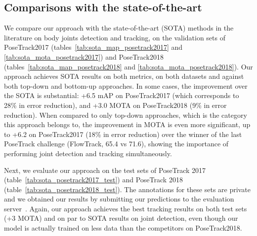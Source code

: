 \documentclass[10pt,twocolumn,letterpaper]{article}
\begin{document}
\subsection{Comparisons with the state-of-the-art} \label{sec:sota}
We compare our approach with the state-of-the-art (SOTA) methods in the literature on body joints detection and tracking, on the validation sets of PoseTrack2017 (tables~\ref{tab:sota_map_posetrack2017} and \ref{tab:sota_mota_posetrack2017}) and PoseTrack2018 (tables~\ref{tab:sota_map_posetrack2018} and \ref{tab:sota_mota_posetrack2018}).
Our approach achieves SOTA results on both metrics, on both datasets and against both top-down and bottom-up approaches. In some cases, the improvement over the SOTA is substantial: +6.5 mAP on PoseTrack2017 (which corresponds to 28\% in error reduction), and +3.0 MOTA on PoseTrack2018 (9\% in error reduction). When compared to only top-down approaches, which is the category this approach belongs to, the improvement in MOTA is even more significant, up to +6.2 on PoseTrack2017 (18\% in error reduction) over the winner of the last PoseTrack challenge (FlowTrack, 65.4 vs 71.6), showing the importance of performing joint detection and tracking simultaneously. 

Next, we evaluate our approach on the test sets of PoseTrack 2017 (table~\ref{tab:sota_posetrack2017_test}) and PoseTrack 2018 (table~\ref{tab:sota_posetrack2018_test}). The annotations for these sets are private and we obtained our results by submitting our predictions to the evaluation server~\cite{posetrack2017}. Again, our approach achieves the best tracking results on both test sets (+3 MOTA) and on par to SOTA results on joint detection, even though our model is actually trained on less data than the competitors on PoseTrack2018. 
\end{document}
